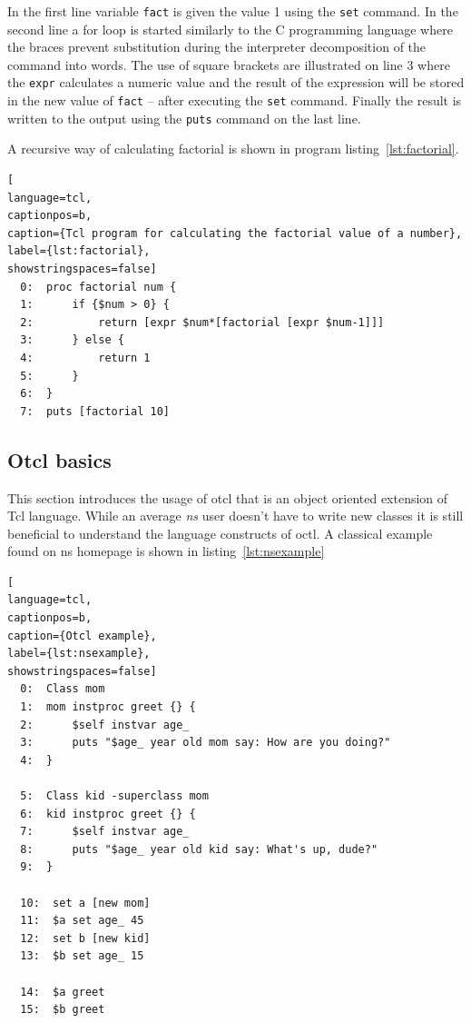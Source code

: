 \documentclass[a4paper]{article}
\begin{document}
In the first line variable \verb!fact! is given the value 1 using the \verb!set! command. In the second
line a for loop is started similarly to the C programming language where the braces prevent substitution during the interpreter
decomposition of the command into words. The use of square brackets are illustrated on line 3 where the
\verb!expr! calculates a numeric value and the result of the expression will be stored in the new value of
\verb!fact! -- after executing the \verb!set! command. Finally the result is written to the
output using the \verb!puts! command on the last line.

A recursive way of calculating factorial is shown in program listing~\ref{lst:factorial}.

\begin{lstlisting}[
language=tcl,
captionpos=b,
caption={Tcl program for calculating the factorial value of a number},
label={lst:factorial},
showstringspaces=false]
  0:  proc factorial num {
  1:      if {$num > 0} {
  2:          return [expr $num*[factorial [expr $num-1]]]
  3:      } else {
  4:          return 1
  5:      }
  6:  }
  7:  puts [factorial 10]
\end{lstlisting}

\subsection{Otcl basics}

This section introduces the usage of otcl that is an object oriented extension of Tcl language. While an average
\emph{ns} user doesn't have to write new classes it is still beneficial to understand the language constructs of octl.
A classical example found on ns homepage is shown in listing~\ref{lst:nsexample}

\begin{lstlisting}[
language=tcl,
captionpos=b,
caption={Otcl example},
label={lst:nsexample},
showstringspaces=false]
  0:  Class mom
  1:  mom instproc greet {} {
  2:      $self instvar age_
  3:      puts "$age_ year old mom say: How are you doing?"
  4:  }

  5:  Class kid -superclass mom
  6:  kid instproc greet {} {
  7:      $self instvar age_
  8:      puts "$age_ year old kid say: What's up, dude?"
  9:  }

  10:  set a [new mom]
  11:  $a set age_ 45
  12:  set b [new kid]
  13:  $b set age_ 15

  14:  $a greet
  15:  $b greet
\end{lstlisting}
\end{document}
